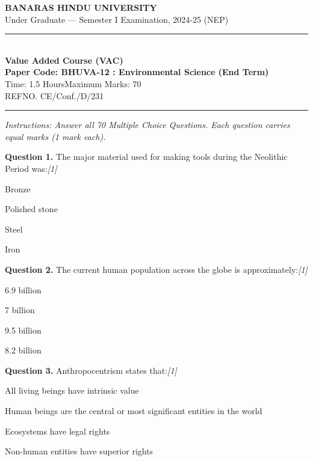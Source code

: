 \documentclass[11pt,a4paper]{article}
\newcommand{\pts}[1]{\hfill   \textit{[#1]}}
\begin{document}
\begin{center}
  {\large\bfseries BANARAS HINDU UNIVERSITY}\\[2pt]
  {\normalsize Under Graduate --- Semester I Examination, 2024-25 (NEP)}\\[6pt]
  \rule{0.8\linewidth}{0.5pt}\\[6pt]
  {\large\bfseries Value Added Course (VAC)}\\[4pt]
  {\large\bfseries Paper Code: BHUVA-12 : Environmental Science (End Term)}\\[4pt]
  {\normalsize Time: 1.5 Hours\hfill Maximum Marks: 70}\\[2pt]
  {\small REFNO. CE/Conf./D/231}
\end{center}

\rule{\linewidth}{0.4pt}

\smallskip



\noindent   \textit{Instructions: Answer all 70 Multiple Choice Questions. Each question carries equal marks (1 mark each).}

\bigskip


\noindent   \textbf{Question 1.} The major material used for making tools during the Neolithic Period was:\pts{1}

\begin{parts}
  \item Bronze
  \item Polished stone
  \item Steel
  \item Iron
\end{parts}

\medskip


\noindent   \textbf{Question 2.} The current human population across the globe is approximately:\pts{1}

\begin{parts}
  \item 6.9 billion
  \item 7 billion
  \item 9.5 billion
  \item 8.2 billion
\end{parts}

\medskip


\noindent   \textbf{Question 3.} Anthropocentrism states that:\pts{1}

\begin{parts}
  \item All living beings have intrinsic value
  \item Human beings are the central or most significant entities in the world
  \item Ecosystems have legal rights
  \item Non-human entities have superior rights
\end{parts}
\end{document}
